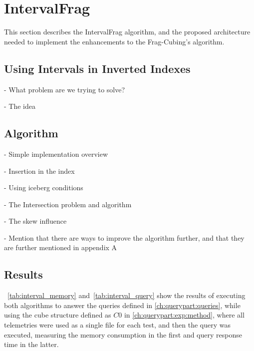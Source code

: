 
\chapter{IntervalFrag}\label{ch:interval}

This section describes the IntervalFrag algorithm, and the proposed architecture needed to implement the enhancements to the Frag-Cubing's algorithm.

\section{Using Intervals in Inverted Indexes}\label{ch:interval:problem}

- What problem are we trying to solve?

- The idea

\section{Algorithm}\label{ch:interval:algo}

- Simple implementation overview

- Insertion in the index

- Using iceberg conditions

- The Intersection problem and algorithm

- The skew influence

- Mention that there are ways to improve the algorithm further, and that they are further mentioned in appendix A

\section{Results}\label{ch:interval:results}

~\autoref{tab:interval_memory} and~\autoref{tab:interval_query} show the results of executing both algorithms to answer the queries defined in \autoref{ch:querypart:queries}, while using the cube structure defined as $C0$ in \autoref{ch:querypart:exp:method}, where all telemetries were used as a single file for each test, and then the query was executed, measuring the memory consumption in the first and query response time in the latter.

